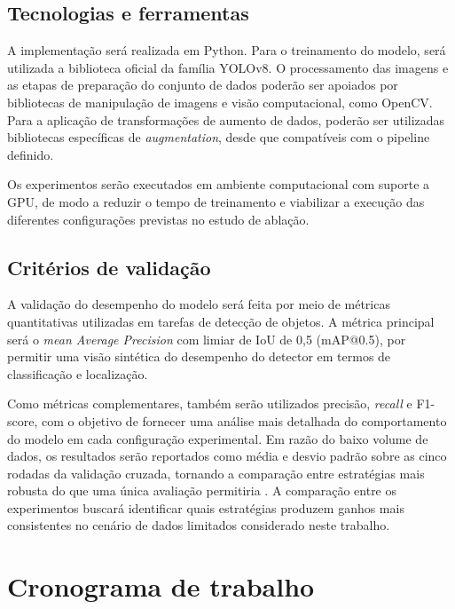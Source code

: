 \documentclass[
    12pt,                %
    openright,           %
    oneside,             %
    a4paper,             %
    english,             %
    brazil               %
]{abntex2}
\begin{document}
\subsection{Tecnologias e ferramentas}
\label{subsec:ferramentas}

A implementação será realizada em Python. Para o treinamento do 
modelo, será utilizada a biblioteca oficial da família YOLOv8. O processamento 
das imagens e as etapas de preparação do conjunto de dados poderão ser apoiados 
por bibliotecas de manipulação de imagens e visão computacional, como OpenCV. 
Para a aplicação de transformações de aumento de dados, poderão ser utilizadas 
bibliotecas específicas de \textit{augmentation}, desde que compatíveis com o 
pipeline definido.

Os experimentos serão executados em ambiente computacional com suporte a GPU, 
de modo a reduzir o tempo de treinamento e viabilizar a execução das diferentes 
configurações previstas no estudo de ablação.

\subsection{Critérios de validação}
\label{subsec:validacao}

A validação do desempenho do modelo será feita por meio de métricas quantitativas 
utilizadas em tarefas de detecção de objetos. A métrica principal será o 
\textit{mean Average Precision} com limiar de IoU de 0,5 (mAP@0.5), por permitir 
uma visão sintética do desempenho do detector em termos de classificação e localização.

Como métricas complementares, também serão utilizados precisão, \textit{recall} 
e F1-score, com o objetivo de fornecer uma análise mais detalhada do comportamento 
do modelo em cada configuração experimental. Em razão do baixo volume de dados, 
os resultados serão reportados como média e desvio padrão sobre as cinco rodadas 
da validação cruzada, tornando a comparação entre estratégias mais robusta do que 
uma única avaliação permitiria \cite{Kohavi1995, Wang2022}. A comparação entre os 
experimentos buscará identificar quais estratégias produzem ganhos mais consistentes 
no cenário de dados limitados considerado neste trabalho.

\section{Cronograma de trabalho}
\label{sec:cronograma}
\end{document}
